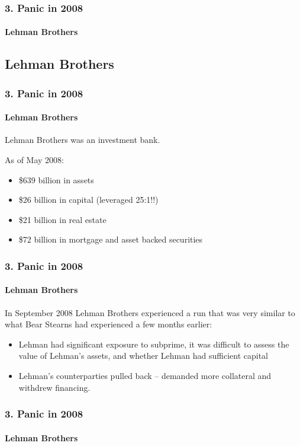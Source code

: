 \documentclass{beamer}
\begin{document}
\begin{frame}[t]
    \frametitle{3. Panic in 2008}
    \framesubtitle{Lehman Brothers}
    \subsection*{Lehman Brothers}


\end{frame}

\begin{frame}[t]
    \frametitle{3. Panic in 2008}
    \framesubtitle{Lehman Brothers}

    Lehman Brothers was an investment bank.   

    As of May 2008:
    \begin{itemize}
        \item \$639 billion in assets
        \item \$26 billion in capital (leveraged 25:1!!)
        \item \$21 billion in real estate
        \item \$72 billion in mortgage and asset backed securities
    \end{itemize}

\end{frame}

\begin{frame}[t]
    \frametitle{3. Panic in 2008}
    \framesubtitle{Lehman Brothers}

    In September 2008 Lehman Brothers experienced a run that was very similar to what Bear Stearns had experienced a few months earlier:
    \begin{itemize}
        \item Lehman had significant exposure to subprime, it was difficult to assess the value of Lehman’s assets, and whether Lehman had sufficient capital
        \item Lehman’s counterparties pulled back – demanded more collateral and withdrew financing.
    \end{itemize}

\end{frame}

\begin{frame}[t]
    \frametitle{3. Panic in 2008}
    \framesubtitle{Lehman Brothers}


\end{frame}
\end{document}
